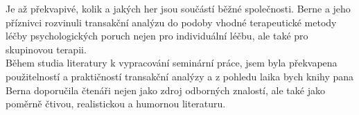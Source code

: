 Je až překvapivé, kolik a jakých her jsou  součástí běžné společnosti. Berne a jeho příznivci rozvinuli transakční analýzu do podoby vhodné terapeutické metody léčby psychologických poruch nejen pro individuální léčbu, ale také pro skupinovou terapii.\\

Během studia literatury k vypracování seminární práce, jsem byla překvapena použitelností a praktičností transakční analýzy a z pohledu laika bych knihy pana Berna doporučila čtenáři nejen jako zdroj odborných znalostí, ale také jako poměrně čtivou, realistickou a humornou literaturu.


